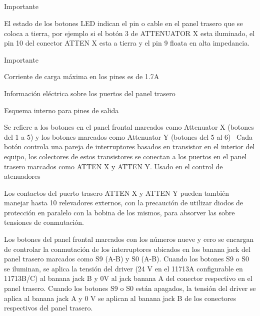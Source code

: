 \documentclass[paper=letter,oneside,fontsize=10pt,parskip=full]{article}
\begin{document}
\bigskip

\subsection{}
Importante

El estado de los botones LED indican el pin o cable en el panel trasero que se coloca a tierra, por ejemplo si el botón
3 de ATTENUATOR X esta iluminado, el pin 10 del conector ATTEN X esta a tierra y el pin 9 floata en alta impedancia.


\bigskip

Importante

Corriente de carga máxima en los pines es de 1.7A

Información eléctrica sobre los puertos del panel trasero


\bigskip

Esquema interno para pines de salida

Se refiere a los botones en el panel frontal marcados como Attenuator X (botones del 1 a 5) y los botones marcados como
Attenuator Y (botones del 5 al 6) \ Cada botón controla una pareja de interruptores basados en transistor en el
interior del equipo, los colectores de estos transistores se conectan a los puertos en el panel trasero marcados como
ATTEN X y ATTEN Y. Usado en el control de atenuadores


\bigskip

Los contactos del puerto trasero ATTEN X y ATTEN Y pueden también manejar hasta 10 relevadores externos, con la
precaución de utilizar diodos de protección en paralelo con la bobina de los mismos, para absorver las sobre tensiones
de conmutación.


\bigskip

Los botones del panel frontal marcados con los números nueve y cero se encargan de controlar la conmutación de los
interruptores ubicados en los banana jack del panel trasero marcados como S9 (A-B) y S0 (A-B). Cuando los botones S9 o
S0 se iluminan, se aplica la tensión del driver (24 V en el 11713A configurable en 11713B/C) al banana jack B y 0V al
jack banana A del conector respectivo en el panel trasero. Cuando los botones S9 o S0 están apagados, la tensión del
driver se aplica al banana jack A y 0 V se aplican al banana jack B de los conectores respectivos del panel trasero.


\bigskip


\bigskip


\bigskip


\bigskip
\end{document}
